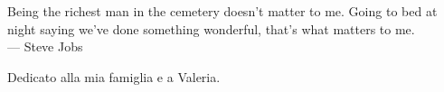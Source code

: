 \cleardoublepage
{}
\thispagestyle{empty}

\vspace*{3cm}

\begin{center}
    Being the richest man in the cemetery doesn't matter to me. Going to bed at night saying we've done something wonderful, that's what matters to me. \\ \medskip
    --- Steve Jobs
\end{center}

\medskip

\begin{center}
    Dedicato alla mia famiglia e a Valeria.
\end{center}
